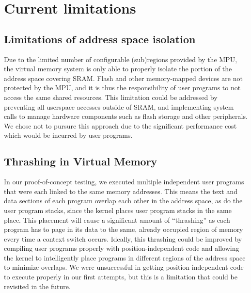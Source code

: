 \documentclass[12pt]{article}
\begin{document}
\section{Current limitations}

\subsection{Limitations of address space isolation}
Due to the limited number of configurable (sub)regions provided by the MPU, the
virtual memory system is only able to properly isolate the portion of the
address space covering SRAM. Flash and other memory-mapped devices are not
protected by the MPU, and it is thus the responsibility of user programs to not
access the same shared resources. This limitation could be addressed by
preventing all userspace accesses outside of SRAM, and implementing system calls
to manage hardware components such as flash storage and other peripherals. We
chose not to pursure this approach due to the significant performance cost which
would be incurred by user programs.

\subsection{Thrashing in Virtual Memory}
In our proof-of-concept testing, we executed multiple independent user programs
that were each linked to the same memory addresses. This means the text and data
sections of each program overlap each other in the address space, as do the
user program stacks, since the kernel places user program stacks in the same 
place. This placement will cause a significant amount of
``thrashing'' as each program has to page in its data to the same, already
occupied region of memory every time a context switch occurs. Ideally, this
thrashing could be improved by compiling user programs properly with
position-independent code and allowing the kernel to intelligently place 
programs in different regions of the address space to minimize overlaps. We
were unsuccessful in getting position-independent code to execute properly in
our first attempts, but this is a limitation that could be revisited in the
future.
\end{document}
